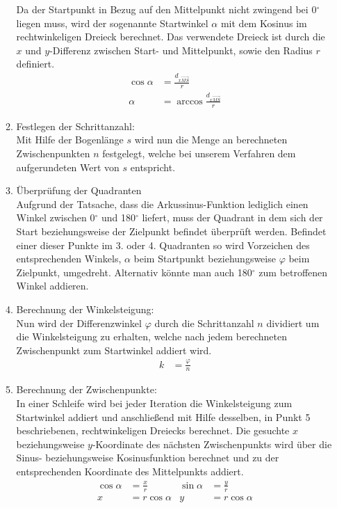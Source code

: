\begin{itemize}
\begin{enumerate}
Da der Startpunkt in Bezug auf den Mittelpunkt nicht zwingend bei 0$^\circ$ liegen muss, wird der sogenannte Startwinkel $\alpha$ mit dem Kosinus im rechtwinkeligen Dreieck berechnet. Das verwendete Dreieck ist durch die $x$ und $y$-Differenz zwischen Start- und Mittelpunkt, sowie den Radius $r$ definiert.
\begin{align*}
\cos \alpha & = \frac{d_{x\overrightarrow{MS}}}{r}\\
\alpha & = \arccos \frac{d_{x\overrightarrow{MS}}}{r}
\end{align*}
\item Festlegen der Schrittanzahl:\\
Mit Hilfe der Bogenlänge $s$ wird nun die Menge an berechneten Zwischenpunkten $n$ festgelegt, welche bei unserem Verfahren dem aufgerundeten Wert von  $s$ entspricht.
\item Überprüfung der Quadranten\\
Aufgrund der Tatsache, dass die Arkussinus-Funktion lediglich einen Winkel zwischen 0$^\circ$ und 180$^\circ$ liefert, muss der Quadrant in dem sich der Start beziehungsweise der Zielpunkt befindet überprüft werden. Befindet einer dieser Punkte  im 3. oder 4. Quadranten so wird Vorzeichen des entsprechenden Winkels, $\alpha$ beim Startpunkt beziehungsweise $\varphi$ beim Zielpunkt, umgedreht. Alternativ könnte man auch 180$^\circ$ zum betroffenen Winkel addieren.
\item Berechnung der Winkelsteigung:\\
Nun wird der Differenzwinkel $\varphi$ durch die Schrittanzahl $n$ dividiert um die Winkelsteigung zu erhalten, welche nach jedem berechneten Zwischenpunkt zum Startwinkel addiert wird.
\begin{align*}
k & = \frac{\varphi}{n}
\end{align*}
\item Berechnung der Zwischenpunkte:\\
In einer Schleife wird bei jeder Iteration die Winkelsteigung zum Startwinkel addiert und anschließend mit Hilfe desselben, in Punkt 5 beschriebenen, rechtwinkeligen Dreiecks berechnet. Die gesuchte $x$ beziehungsweise $y$-Koordinate des nächsten Zwischenpunkts wird über die Sinus- beziehungsweise Kosinusfunktion berechnet und zu der entsprechenden Koordinate des Mittelpunkts addiert.
\begin{align*}
\cos \alpha & = \frac{x}{r} & \sin \alpha & = \frac{y}{r}\\
x & = r \cos \alpha & y & = r \cos \alpha
\end{align*}

\end{enumerate}
\end{itemize}
